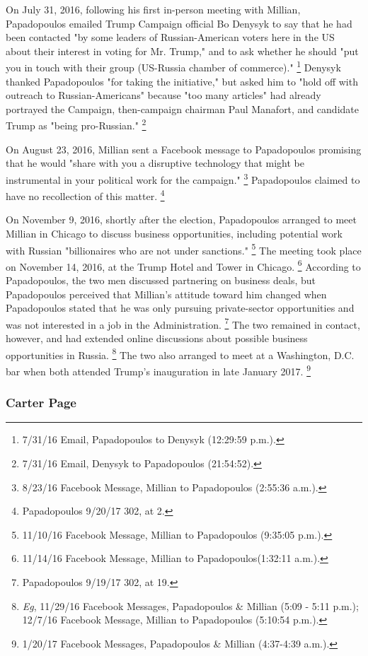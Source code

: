 On July 31, 2016, following his first in-person meeting with Millian, Papadopoulos emailed Trump Campaign official Bo Denysyk to say that he had been contacted "by some leaders of Russian-American voters here in the US about their interest in voting for Mr. Trump," and to ask whether he should "put you in touch with their group (US-Russia chamber of commerce)."%
\footnote{7/31/16 Email, Papadopoulos to Denysyk (12:29:59 p.m.).}
Denysyk thanked Papadopoulos "for taking the initiative," but asked him to "hold off with outreach to Russian-Americans" because "too many articles" had already portrayed the Campaign, then-campaign chairman Paul Manafort, and candidate Trump as "being pro-Russian."%
\footnote{7/31/16 Email, Denysyk to Papadopoulos (21:54:52).}

On August 23, 2016, Millian sent a Facebook message to Papadopoulos promising that he would "share with you a disruptive technology that might be instrumental in your political work for the campaign."%
\footnote{8/23/16 Facebook Message, Millian to Papadopoulos (2:55:36 a.m.).}
Papadopoulos claimed to have no recollection of this matter.%
\footnote{Papadopoulos 9/20/17 302, at 2.}

On November 9, 2016, shortly after the election, Papadopoulos arranged to meet Millian in Chicago to discuss business opportunities, including potential work with Russian "billionaires who are not under sanctions."%
\footnote{11/10/16 Facebook Message, Millian to Papadopoulos (9:35:05 p.m.).}
The meeting took place on November 14, 2016, at the Trump Hotel and Tower in Chicago.%
\footnote{11/14/16 Facebook Message, Millian to Papadopoulos(1:32:11 a.m.).}
According to Papadopoulos, the two men discussed partnering on business deals, but Papadopoulos perceived that Millian's attitude toward him changed when Papadopoulos stated that he was only pursuing private-sector opportunities and was not interested in a job in the Administration.%
\footnote{Papadopoulos 9/19/17 302, at 19.}
The two remained in contact, however, and had extended online discussions about possible business opportunities in Russia.%
\footnote{\textit{Eg}, 11/29/16 Facebook Messages, Papadopoulos \& Millian (5:09 - 5:11 p.m.);
12/7/16 Facebook Message, Millian to Papadopoulos (5:10:54 p.m.).}
The two also arranged to meet at a Washington, D.C. bar when both attended Trump's inauguration in late January 2017.%
\footnote{1/20/17 Facebook Messages, Papadopoulos \& Millian (4:37-4:39 a.m.).}

\subsubsection{Carter Page}

